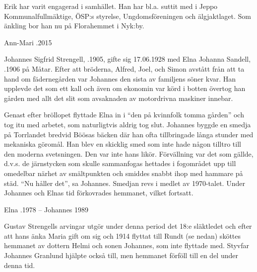 Erik har varit engagerad i samhället. Han har bl.a. suttit med i Jeppo Kommunalfullmäktige, ÖSP:s styrelse, Ungdomsföreningen och älgjaktlaget. Som änkling bor han nu på Florahemmet i Nyk:by.
\begin{jhchildren}
  \item {}
  \item {}
  \item {}
  \item {}
\end{jhchildren}
Ann-Mari .2015


Johannes Sigfrid Strengell, .1905, gifte sig 17.06.1928 med Elna Johanna Sandell, .1906 på Måtar. Efter att bröderna, Alfred, Joel, och Simon avstått från att ta hand om fädernegården var Johannes den sista av familjens söner kvar.  Han upplevde det som ett kall och även om ekonomin var körd i botten övertog han gården med allt det slit som avsaknaden av motordrivna maskiner innebar.

Genast efter bröllopet flyttade Elna  in i ``den på kvinnfolk tomma gården'' och tog itu med arbetet, som naturligtvis aldrig tog slut. Johannes byggde en smedja på Torrlandet bredvid Böösas bäcken där han ofta tillbringade långa stunder med mekaniska göromål. Han blev en skicklig smed som inte hade någon tilltro till  den moderna svetsningen. Den var inte hans likör. Förvällning var det som gällde, d.v.s. de järnstycken som skulle sammanfogas hettades i fogområdet upp till omedelbar närhet av smältpunkten och smiddes snabbt ihop med hammare på städ. ``Nu håller det'', sa Johannes. Smedjan revs i medlet av 1970-talet. Under Johannes och Elnas tid förkovrades hemmanet, vilket fortsatt.
\begin{jhchildren}
  \item {}
  \item {}
  \item {}
  \item {}
\end{jhchildren}
Elna .1978  --  Johannes  1989


Gustav Strengells arvingar utgör under denna period det 18:e släktledet och efter att hans änka Maria gift om sig och 1914 flyttat till Rundt (se nedan) sköttes hemmanet av dottern Helmi och sonen Johannes, som inte flyttade med. Styvfar Johannes Granlund hjälpte också till, men hemmanet förföll till en del under denna tid.


